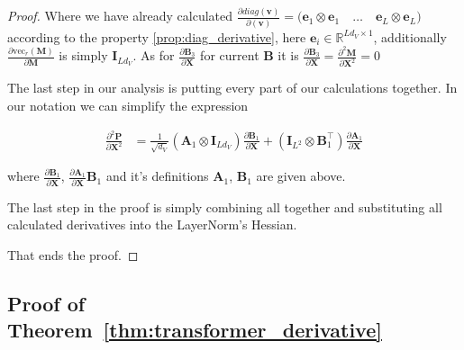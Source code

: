 \documentclass{article}
\begin{document}
\begin{proof}
Where we have already calculated $\frac{\partial \textit{diag}(\mathbf{v})}{\partial (\mathbf{v})} = \Big(\mathbf{e}_1 \otimes \mathbf{e}_1 \quad \dots  \quad \mathbf{e}_L \otimes \mathbf{e}_L\Big)$ according to the property \ref{prop:diag_derivative}, here $\mathbf{e}_i \in \mathbb{R}^{Ld_V \times 1}$, additionally $\frac{\partial \mathrm{vec}_r(\mathbf{M})}{\partial \mathbf{M}}$ is simply $\mathbf{I}_{L d_V}$. As for $\frac{\partial \mathbf{B}_3}{\partial \mathbf{X}}$ for current $\mathbf{B}$ it is $\frac{\partial \mathbf{B}_3}{\partial \mathbf{X}} = \frac{\partial^2 \mathbf{M}}{\partial\mathbf{X}^2} = 0$

The last step in our analysis is putting every part of our calculations together. In our notation we can simplify the expression

\begin{align*}
    \frac{\partial^2 \mathbf{P}}{\partial \mathbf{X}^2} &= \frac{1}{\sqrt{d_V}} \left(\mathbf{A}_1 \otimes  \mathbf{I}_{Ld_V}  \right) \frac{\partial \mathbf{B}_1}{\partial \mathbf{X}} + \left( \mathbf{I}_{L^2} \otimes  \mathbf{B}_1^\top \right) \frac{\partial \mathbf{A}_1}{\partial \mathbf{X}}
\end{align*}

where $\frac{\partial \mathbf{B}_1}{\partial \mathbf{X}}$, $\frac{\partial \mathbf{A}_1}{\partial \mathbf{X}} \mathbf{B}_1$ and it's definitions $\mathbf{A}_1$, $\mathbf{B}_1$ are given above.

The last step in the proof is simply combining all together and substituting all calculated derivatives into the LayerNorm's Hessian.

That ends the proof.
\end{proof}

\subsection{Proof of Theorem~\ref{thm:transformer_derivative}}\label{app:proof_transformer_derivative}
\end{document}
